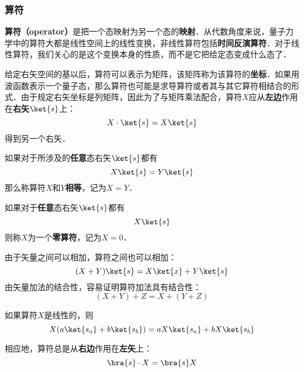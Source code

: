 \subsubsection{算符}

\textbf{算符（operator）}是把一个态映射为另一个态的\textbf{映射}．从代数角度来说，量子力学中的算符大都是线性空间上的线性变换，非线性算符包括\textbf{时间反演算符}．对于线性算符，我们关心的是这个变换本身的性质，而不是它把给定态变成什么态了．

给定右矢空间的基以后，算符可以表示为矩阵，该矩阵称为该算符的\textbf{坐标}．如果用波函数表示一个量子态，那么算符也可能是求导算符或者其与其它算符相结合的形式．由于规定右矢坐标是列矩阵，因此为了与矩阵乘法配合，算符$X$应从\textbf{左边}作用在\textbf{右矢}$\ket{s}$上：
\begin{equation}
X\cdot\ket{s} = X\ket{s}
\end{equation}
得到另一个右矢．


\begin{definition}{}

如果对于所涉及的\textbf{任意}态右矢$\ket{s}$都有
\begin{equation}
X\ket{s}=Y\ket{s}
\end{equation}
那么称算符$X$和$Y$\textbf{相等}，记为$X=Y$．


如果对于\textbf{任意}态右矢$\ket{s}$都有
\begin{equation}
X\ket{s}
\end{equation}
则称$X$为一个\textbf{零算符}，记为$X=0$．

\end{definition}




由于矢量之间可以相加，算符之间也可以相加：
\begin{equation}
(X+Y)\ket{s} = X\ket{x}+Y\ket{s}
\end{equation}
由矢量加法的结合性，容易证明算符加法具有结合性：
\begin{equation}
(X+Y)+Z=X+(Y+Z)
\end{equation}

如果算符$X$是线性的，则
\begin{equation}
X(a\ket{s_a}+b\ket{s_b}) = aX\ket{s_a}+bX\ket{s_b}
\end{equation}

相应地，算符总是从\textbf{右边}作用在\textbf{左矢}上：
\begin{equation}
\bra{s}\cdot X = \bra{s}X
\end{equation}

